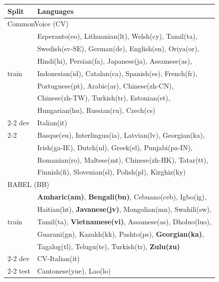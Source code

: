 \begin{table}[t]
\begin{tabular}{@{}ll@{}}
\toprule
\textbf{Split}         & \textbf{Languages}                                   \\
\midrule
\multicolumn{2}{l}{CommonVoice (CV)} \\
\multirow{7}{*}{train} & Esperanto(eo), Lithuanian(lt), Welsh(cy), Tamil(ta),    \\
                       & Swedish(sv-SE), German(de), English(en), Oriya(or),  \\
                       & Hindi(hi), Persian(fa), Japanese(ja), Assamese(as),       \\
                       & Indonesian(id), Catalan(ca), Spanish(es), French(fr),   \\
                       & Portuguese(pt), Arabic(ar), Chinese(zh-CN),            \\
                       & Chinese(zh-TW), Turkish(tr), Estonian(et),             \\
                       & Hungarian(hu), Russian(ru), Czech(cs)                  \\
\cmidrule(lr){2-2}
dev                    & Italian(it)                                          \\
\cmidrule(lr){2-2}
\multirow{4}{*}{test}  & Basque(eu), Interlingua(ia), Latvian(lv), Georgian(ka), \\
                       & Irish(ga-IE), Dutch(nl), Greek(el), Punjabi(pa-IN),     \\
                       & Romanian(ro), Maltese(mt), Chinese(zh-HK), Tatar(tt),   \\
                       & Finnish(fi), Slovenian(sl), Polish(pl), Kirghiz(ky)     \\
\midrule
\multicolumn{2}{l}{BABEL (BB)} \\
\multirow{5}{*}{train} & \textbf{Amharic(am)}, \textbf{Bengali(bn)}, Cebuano(ceb), Igbo(ig),  \\
                       & Haitian(ht), \textbf{Javanese(jv)}, Mongolian(mn), Swahili(sw),  \\
                       & Tamil(ta), \textbf{Vietnamese(vi)}, Assamese(as), Dholuo(luo),   \\
                       & Guarani(gn), Kazakh(kk), Pashto(ps), \textbf{Georgian(ka)},         \\
                       & Tagalog(tl), Telugu(te), Turkish(tr), \textbf{Zulu(zu)}          \\
\cmidrule(lr){2-2}
dev                    & CV-Italian(it)                                       \\
\cmidrule(lr){2-2}
test                   & Cantonese(yue), Lao(lo)     \\
\bottomrule
\end{tabular}
\end{table}